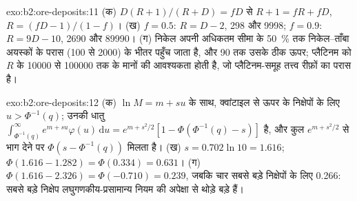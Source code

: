 \begin{solution}{exo:b2:ore-deposits:11}
(क) $D(R + 1)/(R + D) = fD$ से $R + 1 = fR + fD$, $R = (fD - 1)/(1 - f)$। (ख) $f = 0.5$: $R = D - 2$,
298 और \num{9998}; $f = 0.9$: $R = 9D - 10$, \num{2690} और \num{89990}। (ग) निकेल अपनी अधिकतम सीमा के
\qty{50}{\percent} तक निकेल--ताँबा अयस्कों के परास (100 से \num{2000}) के भीतर पहुँच जाता है, और 90 तक उसके ठीक ऊपर;
प्लैटिनम को $R$ के \num{10000} से \num{100000} तक के मानों की आवश्यकता होती है, जो प्लैटिनम-समूह तत्त्व रीफ़ों का परास है।
\end{solution}

\begin{solution}{exo:b2:ore-deposits:12}
(क) $\ln M = m + s u$ के साथ, क्वांटाइल से ऊपर के निक्षेपों के लिए $u > \Phi^{-1}(q)$; उनकी धातु
$\int_{\Phi^{-1}(q)}^{\infty} e^{m + su}\varphi(u)\,\mathrm{d}u = e^{m + s^2/2}[1 - \Phi(\Phi^{-1}(q) -
s)]$ है, और कुल $e^{m + s^2/2}$ से भाग देने पर $\Phi(s - \Phi^{-1}(q))$ मिलता है। (ख) $s = 0.702 \ln 10 =
1.616$; $\Phi(1.616 - 1.282) = \Phi(0.334) = 0.631$। (ग) $\Phi(1.616 - 2.326) = \Phi(-0.710) = 0.239$,
जबकि चार सबसे बड़े निक्षेपों के लिए 0.266: सबसे बड़े निक्षेप लघुगणकीय-प्रसामान्य नियम की अपेक्षा से
थोड़े बड़े हैं।
\end{solution}

